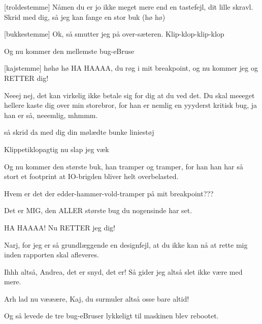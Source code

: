 \documentclass[a4paper,11pt]{article}
\begin{document}
\begin{sketch}

   [troldestemme] Nåmen du er jo ikke meget mere end en tastefejl, dit
  lille skravl. Skrid med dig, så jeg kan fange en stor buk (hø hø)

   [bukkestemme] Ok, så smutter jeg på over-sæteren.  Klip-klop-klip-klop

   Og nu kommer den mellemste bug-eBruse

   [kajstemme] høhø hø  HA HAAAA, du røg i mit
  breakpoint, og nu kommer jeg og RETTER dig!

   Neeej nej, det kan virkelig ikke betale sig for dig at du ved det. Du
  skal meeeget hellere kaste dig over min storebror, for han er nemlig en
  yyyderst kritisk bug, ja han er så, neeemlig, mhmmm.

% 
% 
   så skrid da med dig din mølædte bunke liniestøj

   Klippetiklopagtig nu slap jeg væk 
  
   Og nu kommer den største buk, han tramper og tramper, for han han har så stort et footprint at IO-brigden bliver helt overbelasted.

   Hvem er det der edder-hammer-vold-tramper på mit breakpoint???

% 
% 
% 
% 
     Det er MIG, den ALLER største bug du nogensinde har set.

   HA HAAAA! Nu RETTER jeg dig!

   Narj, for jeg er så grundlæggende en designfejl, at du ikke kan nå at
  rette mig inden rapporten skal afleveres.

   Ihhh altså, Andrea, det er snyd, det er!  Så gider jeg altså slet ikke
  være med mere.

   Arh lad nu vææære, Kaj, du surmuler altså osse bare altid!

   Og så levede de tre bug-eBruser lykkeligt til maskinen blev rebootet.


\end{sketch}
\end{document}

